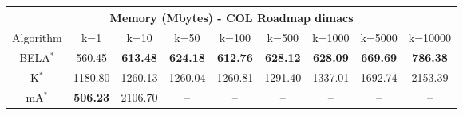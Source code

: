 \begin{tabular}{c|cccccccc}\toprule
\multicolumn{9}{c}{Memory (Mbytes) - COL Roadmap dimacs}\\ \midrule
Algorithm & k=1 & k=10 & k=50 & k=100 & k=500 & k=1000 & k=5000 & k=10000 \\ \midrule
BELA$^*$ & 560.45 & \textbf{613.48} & \textbf{624.18} & \textbf{612.76} & \textbf{628.12} & \textbf{628.09} & \textbf{669.69} & \textbf{786.38} \\
K$^*$ & 1180.80 & 1260.13 & 1260.04 & 1260.81 & 1291.40 & 1337.01 & 1692.74 & 2153.39 \\
mA$^*$ & \textbf{506.23} & 2106.70 & -- & -- & -- & -- & -- & -- \\ \bottomrule 
\end{tabular}
